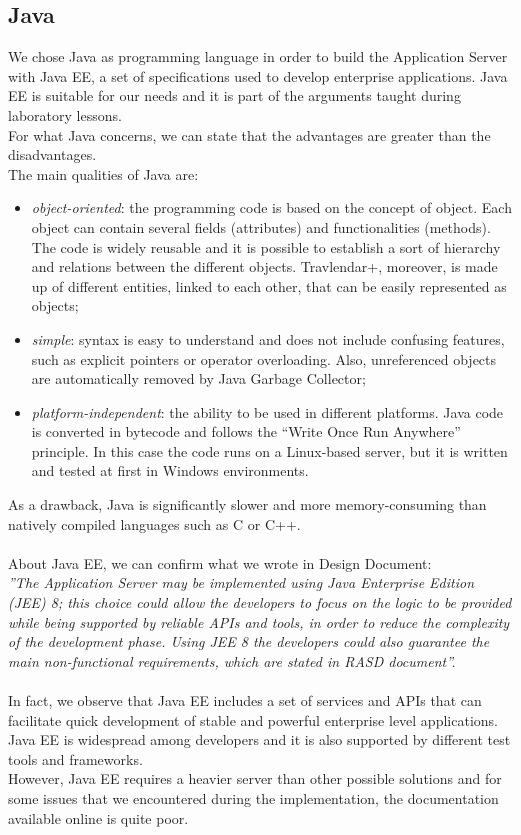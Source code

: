 \subsection{Java}
\label{subsect:Java}
We chose Java as programming language in order to build the Application Server with Java EE, a set of specifications used to develop enterprise applications. Java EE is suitable for our needs and it is part of the arguments taught during laboratory lessons.\\
For what Java concerns, we can state that the advantages are greater than the disadvantages. \\
The main qualities of Java are:
\begin{itemize}
\item \textit{object-oriented}: the programming code is based on the concept of object. Each object can contain several fields (attributes) and functionalities (methods). The code is widely reusable and it is possible to establish a sort of hierarchy and relations between the different objects. Travlendar+, moreover, is made up of different entities, linked to each other, that can be easily represented as objects;
\item \textit{simple}: syntax is easy to understand and does not include confusing features, such as explicit pointers or operator overloading. Also, unreferenced objects are automatically removed by Java Garbage Collector;
\item \textit{platform-independent}: the ability to be used in different platforms. Java code is converted in bytecode and follows the “Write Once Run Anywhere” principle. In this case the code runs on a Linux-based server, but it is written and tested at first in Windows environments. 
\end{itemize}
As a drawback, Java is significantly slower and more memory-consuming than natively compiled languages such as C or C++.\\\\
About Java EE, we can confirm what we wrote in Design Document:\\
\textit{''The Application Server may be implemented using Java Enterprise Edition (JEE) 8; this choice could allow the developers to focus on the logic to be provided while being supported by reliable APIs and tools, in order to reduce the complexity of the development phase. Using JEE 8 the developers could also guarantee the main non-functional requirements, which are stated in RASD document''.}\\\\
In fact, we observe that Java EE includes a set of services and APIs that can facilitate quick development of stable and powerful enterprise level applications. Java EE is widespread among developers and it is also supported by different test tools and frameworks.\\
However, Java EE requires a heavier server than other possible solutions and for some issues that we encountered during the implementation, the documentation available online is quite poor. 
